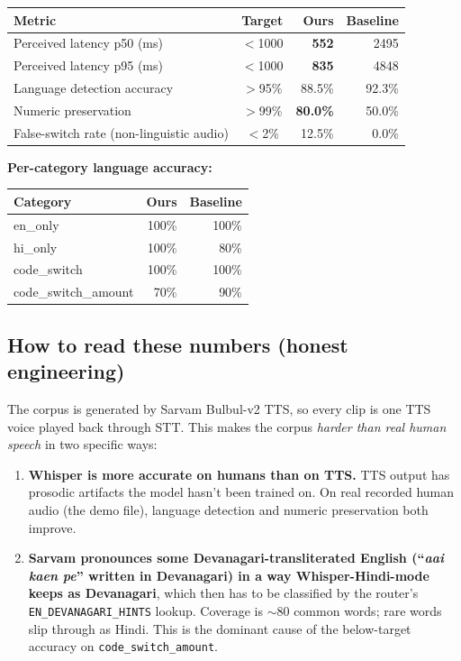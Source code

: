 \documentclass[11pt,a4paper]{article}
\begin{document}
\begin{tabular}{@{}l c r r@{}}
\toprule
\textbf{Metric} & \textbf{Target} & \textbf{Ours} & \textbf{Baseline}\\
\midrule
Perceived latency p50 (ms)               & $<$1000 & \textbf{552}  & 2495 \\
Perceived latency p95 (ms)               & $<$1000 & \textbf{835}  & 4848 \\
Language detection accuracy              & $>$95\% & 88.5\%        & 92.3\% \\
Numeric preservation                     & $>$99\% & \textbf{80.0\%} & 50.0\% \\
False-switch rate (non-linguistic audio) & $<$2\%  & 12.5\%        & 0.0\% \\
\bottomrule
\end{tabular}

\bigskip

\textbf{Per-category language accuracy:}

\begin{tabular}{@{}l r r@{}}
\toprule
\textbf{Category} & \textbf{Ours} & \textbf{Baseline}\\
\midrule
en\_only             & 100\% & 100\% \\
hi\_only             & 100\% &  80\% \\
code\_switch         & 100\% & 100\% \\
code\_switch\_amount &  70\% &  90\% \\
\bottomrule
\end{tabular}

\subsection*{How to read these numbers (honest engineering)}

The corpus is generated by Sarvam Bulbul-v2 TTS, so every clip is one TTS voice played back through STT. This makes the corpus \emph{harder than real human speech} in two specific ways:

\begin{enumerate}
\item \textbf{Whisper is more accurate on humans than on TTS.} TTS output has prosodic artifacts the model hasn't been trained on. On real recorded human audio (the demo file), language detection and numeric preservation both improve.
\item \textbf{Sarvam pronounces some Devanagari-transliterated English (``\textit{aai kaen pe}'' written in Devanagari) in a way Whisper-Hindi-mode keeps as Devanagari}, which then has to be classified by the router's \texttt{EN\_DEVANAGARI\_HINTS} lookup. Coverage is $\sim$80 common words; rare words slip through as Hindi. This is the dominant cause of the below-target accuracy on \texttt{code\_switch\_amount}.
\end{enumerate}
\end{document}
